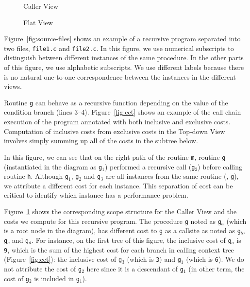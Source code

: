\begin{figure}
\caption{Caller View}
\label{fig:metrics-callers}
\end{figure}

\begin{figure}
\caption{Flat View}
\label{fig:metrics-flat}
\end{figure}


Figure~\ref{fig:source-files} shows an example of a recursive program separated into two files, \texttt{file1.c} and \texttt{file2.c}.
In this figure, we use numerical subscripts to distinguish between different instances of the same procedure.
In the other parts of this figure, we use alphabetic subscripts.
We use different labels because there is no natural one-to-one correspondence between the instances in the different views.

Routine \texttt{g} can behave as a recursive function depending on the value of the condition branch (lines 3--4).
Figure~\ref{fig:cct} shows an example of the call chain execution of the program annotated with both inclusive and exclusive costs.
Computation of inclusive costs from exclusive costs in the Top-down View involves simply summing up all of the costs in the subtree below.

In this figure, we can see that on the right path of the routine \texttt{m}, routine \texttt{g} (instantiated in the diagram as \texttt{g$_1$}) performed a recursive call (\texttt{g$_2$}) before calling routine \texttt{h}.
Although \texttt{g$_1$}, \texttt{g$_2$} and \texttt{g$_3$} are all instances from the same routine (\ie{}, \texttt{g}), we attribute a different cost for each instance.
This separation of cost can be critical to identify which instance has a performance problem.

Figure~\ref{fig:metrics-callers} shows the corresponding scope structure for the Caller View and the costs we compute for this recursive program.
The procedure \texttt{g} noted as \texttt{g$_a$} (which is a root node in the diagram), has different cost to \texttt{g} as a callsite as noted as \texttt{g$_b$}, \texttt{g$_c$} and \texttt{g$_d$}.
For instance, on the first tree of this figure, the inclusive cost of \texttt{g$_a$} is \texttt{9}, which is the sum of the highest cost for each branch in calling context tree (Figure~\ref{fig:cct}): the inclusive cost of \texttt{g$_3$} (which is \texttt{3}) and \texttt{g$_1$} (which is \texttt{6}).
We do not attribute the cost of \texttt{g$_2$} here since it is a descendant of \texttt{g$_1$} (in other term, the cost of \texttt{g$_2$} is included in \texttt{g$_1$}).

